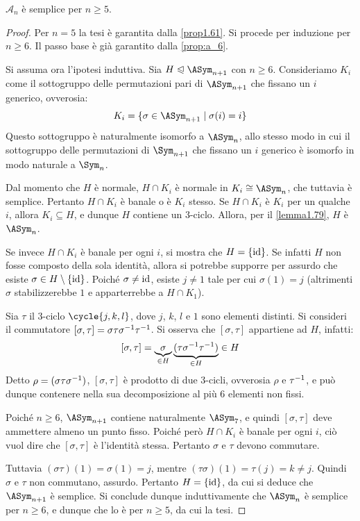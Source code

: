 \documentclass[11pt]{scrartcl}
\begin{document}
	\begin{theorem}
		\label{th:an_semplice}
		$\mathcal{A}_n$ è semplice per $n \geq 5$.
	\end{theorem}
	
	\begin{proof}
		Per $n = 5$ la tesi è garantita dalla \autoref{prop1.61}. Si procede per
		induzione per $n \geq 6$. Il passo base è già garantito dalla \autoref{prop:a_6}.
		\medskip
		
		Si assuma ora l'ipotesi induttiva. Sia $H \trianglelefteqslant \ASym_{n+1}$
		con $n \geq 6$. Consideriamo $K_i$ come il sottogruppo delle permutazioni pari
		di $\ASym_{n+1}$ che fissano un $i$ generico, ovverosia:
		\[ K_i = \{ \sigma \in \ASym_{n+1} \mid \sigma(i) = i \} \]
		Questo sottogruppo è naturalmente isomorfo a $\ASym_n$, allo stesso modo in
		cui il sottogruppo delle permutazioni di $\Sym_{n+1}$ che fissano un $i$ generico
		è isomorfo in modo naturale a $\Sym_n$. \medskip
		
		
		Dal momento che $H$ è normale, $H \cap K_i$ è normale in $K_i \cong \ASym_n$, che
		tuttavia è semplice. Pertanto $H \cap K_i$ è banale o è $K_i$ stesso.
		Se $H \cap K_i$ è $K_i$ per un qualche $i$,
		allora $K_i \subseteq H$, e dunque $H$ contiene un
		$3$-ciclo. Allora, per il \autoref{lemma1.79}, $H$ è $\ASym_n$. \medskip
		
		
		Se invece $H \cap K_i$ è banale per ogni $i$, si mostra che $H = \{\mathrm{id}\}$.
		Se infatti $H$ non fosse composto della sola identità, allora si potrebbe supporre
		per assurdo che esiste $\sigma \in H \setminus \{\mathrm{id}\}$. Poiché $\sigma \neq \mathrm{id}$,
		esiste $j \neq 1$ tale per cui $\sigma(1) = j$ (altrimenti $\sigma$ stabilizzerebbe
		$1$ e apparterrebbe a $H \cap K_1$). \medskip
		
		
		Sia $\tau$ il $3$-ciclo $\cycle{j, k, l}$, dove $j$, $k$, $l$ e $1$ sono elementi
		distinti. Si consideri il commutatore $[\sigma, \tau] = \sigma \tau \sigma^{-1} \tau^{-1}$. Si osserva che $[\sigma, \tau]$ appartiene ad $H$, infatti:
		\[ [\sigma, \tau] = \underbrace{\sigma}_{\in H} \underbrace{(\tau \sigma^{-1} \tau^{-1})}_{\in H} \in H \]
		Detto $\rho = (\sigma \tau \sigma^{-1})$, $[\sigma, \tau]$ è prodotto di due
		$3$-cicli, ovverosia $\rho$ e $\tau^{-1}$, e può dunque contenere nella sua
		decomposizione al più $6$ elementi non fissi. \medskip
		

		Poiché $n \geq 6$, $\ASym_{n+1}$ contiene
		naturalmente $\ASym_{7}$, e quindi $[\sigma, \tau]$ deve ammettere almeno un
		punto fisso. Poiché però $H \cap K_i$ è banale per ogni $i$, ciò vuol dire
		che $[\sigma, \tau]$ è l'identità stessa. Pertanto $\sigma$ e $\tau$ devono
		commutare. \medskip
		
		
		Tuttavia $(\sigma \tau)(1) = \sigma(1) = j$, mentre $(\tau \sigma)(1) = \tau(j) =
		k \neq j$. Quindi $\sigma$ e $\tau$ non commutano, assurdo. Pertanto
		$H = \{\mathrm{id}\}$, da cui si deduce che $\ASym_{n+1}$ è semplice. Si conclude
		dunque induttivamente che $\ASym_n$ è semplice per $n \geq 6$, e dunque che
		lo è per $n \geq 5$, da cui la tesi.
	\end{proof}
	
\end{document}
